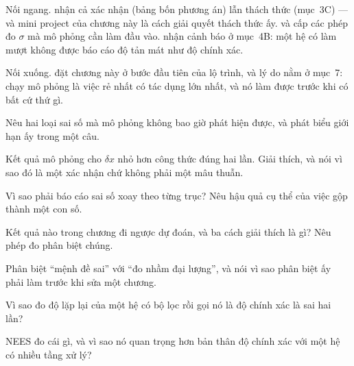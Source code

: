 \documentclass[../../marker.tex]{subfiles}
\begin{document}
Nối ngang.  nhận cả xác nhận (bảng bốn phương án) lẫn thách thức (mục~3C) --- và mini project của chương này là cách giải quyết thách thức ấy.  và  cấp các phép đo \(\sigma\) mà mô phỏng cần làm đầu vào.  nhận cảnh báo ở mục~4B: một hệ có làm mượt không được báo cáo độ tản mát như độ chính xác.

Nối xuống.  đặt chương này ở bước đầu tiên của lộ trình, và lý do nằm ở mục~7: chạy mô phỏng là việc rẻ nhất có tác dụng lớn nhất, và nó làm được trước khi có bất cứ thứ gì.

\begin{tukiem}
\item Nêu hai loại sai số mà mô phỏng không bao giờ phát hiện được, và phát biểu giới hạn ấy trong một câu.
\item Kết quả mô phỏng cho \(\delta x\) nhỏ hơn công thức đúng hai lần. Giải thích, và nói vì sao đó là một xác nhận chứ không phải một mâu thuẫn.
\item Vì sao phải báo cáo sai số xoay theo từng trục? Nêu hậu quả cụ thể của việc gộp thành một con số.
\item Kết quả nào trong chương đi ngược dự đoán, và ba cách giải thích là gì? Nêu phép đo phân biệt chúng.
\item Phân biệt ``mệnh đề sai'' với ``đo nhầm đại lượng'', và nói vì sao phân biệt ấy phải làm trước khi sửa một chương.
\item Vì sao đo độ lặp lại của một hệ có bộ lọc rồi gọi nó là độ chính xác là sai hai lần?
\item NEES đo cái gì, và vì sao nó quan trọng hơn bản thân độ chính xác với một hệ có nhiều tầng xử lý?
\end{tukiem}
\ifSubfilesClassLoaded{\printbibliography[title={Nguồn}]}{}
\end{document}

